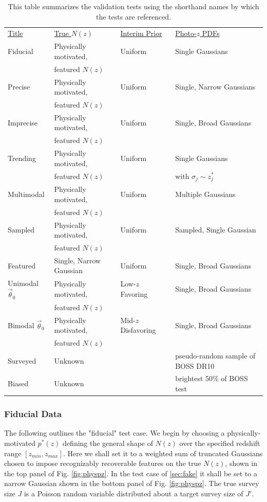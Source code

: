 \documentclass[preprint]{aastex}
\newcommand{\textul}{\underline}
\begin{document}
\begin{table}
\begin{tabular}{llll}
\textul{Title} & \textul{True $N(z)$} & \textul{Interim Prior} & 
\textul{Photo-$z$ PDFs}\\
Fiducial & Physically motivated, & Uniform & Single Gaussians\\
& featured $N(z)$ &&\\
Precise & Physically motivated, & Uniform & Single, Narrow Gaussians\\
& featured $N(z)$ &&\\
Imprecise & Physically motivated, & Uniform & Single, Broad Gaussians\\
& featured $N(z)$ &&\\
Trending & Physically motivated, & Uniform & Single Gaussians\\
& featured $N(z)$ && with $\sigma_{j}\sim z^{*}_{j}$\\
Multimodal & Physically motivated, & Uniform & Multiple Gaussians\\
& featured $N(z)$ &&\\
Sampled & Physically motivated, & Uniform & Sampled, Single Gaussian\\
& featured $N(z)$ &&\\
Featured & Single, Narrow Gaussian & Uniform & Single, Broad Gaussians\\
Unimodal $\vec{\theta}_{0}$ & Physically motivated, & Low-$z$ Favoring & 
Single, Broad Gaussians\\
& featured $N(z)$ &&\\
Bimodal $\vec{\theta}_{0}$& Physically motivated, & Mid-$z$ Disfavoring & 
Single, Broad Gaussians\\
& featured $N(z)$ &&\\
Surveyed & Unknown & \citet{Sheldon2012} & pseudo-random sample of BOSS DR10\\
Biased & Unknown & \citet{Sheldon2012} & brightest 50\% of BOSS test
\end{tabular}
\caption{This table summarizes the validation tests using the shorthand names 
by which the tests are referenced.}
\label{tab:key}
\end{table}

\subsubsection{Fiducial Data}
\label{sec:mock}

The following outlines the "fiducial" test case.  We begin by choosing a 
physically-motivated $p^{*}(z)$ defining the general shape of $N(z)$ over the 
specified redshift range $[z_{min},z_{max}]$.  Here we shall set it to a 
weighted sum of truncated Gaussians chosen to impose recognizably recoverable 
features on the true $N(z)$, shown in the top panel of Fig. \ref{fig:physpz}.  
In the test case of \ref{sec:fake} it shall be set to a narrow Gaussian shown 
in the bottom panel of Fig. \ref{fig:physpz}.  The true survey size $J$ is a 
Poisson random variable distributed about a target survey size of $J'$.
\end{document}
